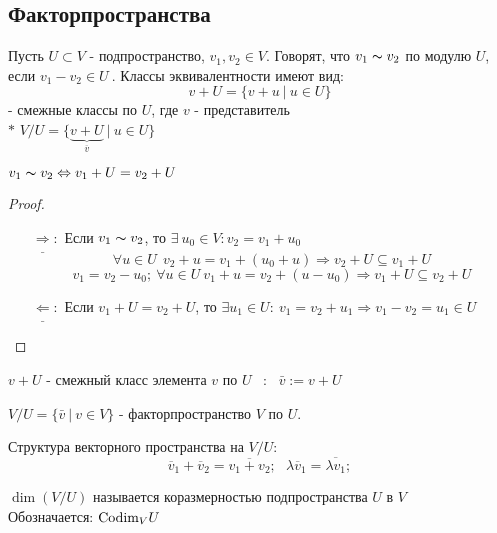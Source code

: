     \subsection*{Факторпространства}
    \begin{definition}
        Пусть $U \subset V$ - подпространство, $v_1,v_2 \in V$. Говорят, что $v_1 \thicksim v_2$ по модулю $U$, если $v_1 - v_2 \in U \ $. Классы эквивалентности имеют вид: 
        $$v + U = \{v + u \ | \ u \in U\}$$
        - смежные классы по $U$, где $v$ - представитель\\
        $*$ $V/U = \{\underbrace{v + U}_{\overline{v}}  \ | \ u \in U\}$
    \end{definition}
    \begin{subtheorem}
        $v_1 \thicksim  v_2 \Leftrightarrow v_1 + U = v_2 + U$
    \end{subtheorem}
    \begin{proof} \tab
        \begin{itemize}
            \item[$\underline{\Rightarrow} :$] Если $v_1 \thicksim v_2$, то $\exists \ u_0 \in V: v_2 = v_1 + u_0$
            $$\forall u \in U \ \ v_2 + u = v_1 + (u_0 + u) \Longrightarrow  v_2 + U \subseteq v_1 + U$$
            $$v_1 = v_2 - u_0; \ \forall u \in U \ v_1 + u = v_2 + (u - u_0) \Longrightarrow  v_1 + U \subseteq v_2 + U$$
            \item[$\underline{\Leftarrow} :$] Если $v_1 + U = v_2 + U$, то $\exists u_1 \in U: \ v_1 = v_2 + u_1 \Longrightarrow v_1 - v_2 = u_1 \in U$
        \end{itemize}
    \end{proof}
    \begin{definition}
        $v + U$ - смежный класс элемента $v$ по $U$ \ : \ $\bar{v} := v + U$
    \end{definition} 
    \begin{definition}
        $V / U = \{\bar{v} \ | \ v\in V\}$ - факторпространство $V$ по $U$.
    \end{definition} 
    \begin{definition}
        Структура векторного пространства на $V / U$:
        $$\overline{v}_1 + \overline{v}_2 = \overline{v_1 + v_2}; \ \ \ \lambda\overline{v}_1 = \overline{\lambda v_1};$$
    \end{definition} 
    \begin{definition}
        $\dim (V/U)$ называется коразмерностью подпространства $U$ в $V$ \\
        Обозначается: $\textup{Codim}_{V} U$ 
    \end{definition} 
